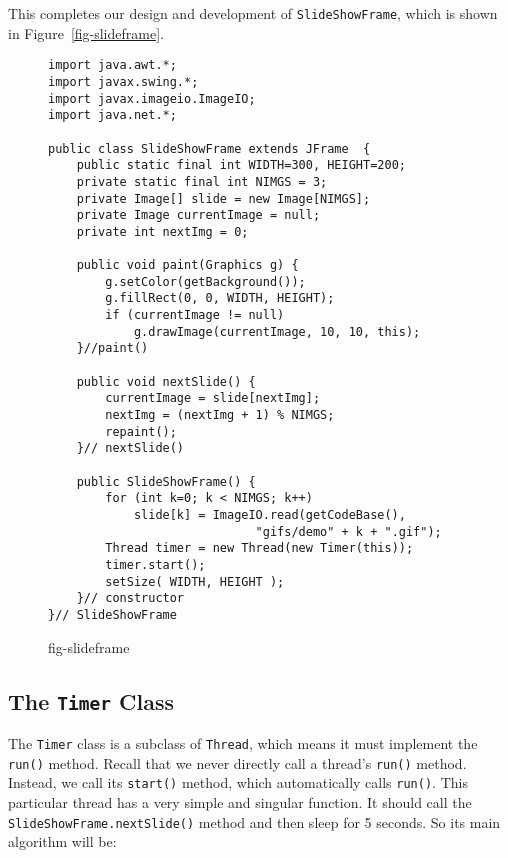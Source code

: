 {

\noindent This completes our design and development
of {\tt SlideShowFrame}, which is shown in Figure~\ref{fig-slideframe}.

\begin{figure}[h]
\jjjprogstart
\begin{jjjlisting}
\begin{lstlisting}
import java.awt.*;
import javax.swing.*;
import javax.imageio.ImageIO;
import java.net.*;

public class SlideShowFrame extends JFrame  {
    public static final int WIDTH=300, HEIGHT=200;
    private static final int NIMGS = 3;
    private Image[] slide = new Image[NIMGS];
    private Image currentImage = null;
    private int nextImg = 0;

    public void paint(Graphics g) {
        g.setColor(getBackground());
        g.fillRect(0, 0, WIDTH, HEIGHT);
        if (currentImage != null)
            g.drawImage(currentImage, 10, 10, this);
    }//paint()

    public void nextSlide() {
        currentImage = slide[nextImg];
        nextImg = (nextImg + 1) % NIMGS;
        repaint();
    }// nextSlide()

    public SlideShowFrame() {
        for (int k=0; k < NIMGS; k++) 
            slide[k] = ImageIO.read(getCodeBase(), 
                             "gifs/demo" + k + ".gif");
        Thread timer = new Thread(new Timer(this));
        timer.start();
        setSize( WIDTH, HEIGHT );
    }// constructor
}// SlideShowFrame
\end{lstlisting}
\end{jjjlisting}
{fig-slideframe}
\end{figure}

\subsection{The {\tt Timer} Class}
\noindent The {\tt Timer} class is a subclass of {\tt Thread}, which means it
must implement the {\tt run()} method.   Recall that we never directly
call a thread's {\tt run()} method.  Instead, we call its {\tt start()}
method, which automatically calls {\tt run()}.  This particular thread
has a very simple and singular function.  It should call the
{\tt SlideShowFrame.nextSlide()} method and then sleep for 5 seconds.
So its main algorithm will be:

}
